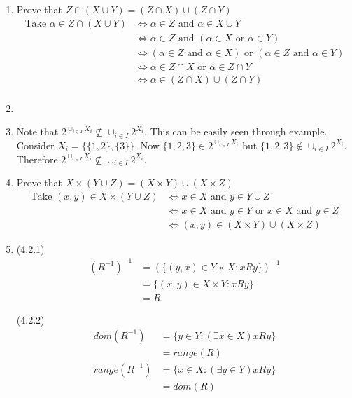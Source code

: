 \begin{enumerate}
    \item Prove that $Z \cap (X \cup Y) = (Z \cap X) \cup (Z \cap Y)$
        \begin{align*}
            \text{Take } \alpha \in Z \cap (X \cup Y) &\Leftrightarrow \alpha \in Z \text{ and } \alpha \in X \cup Y\\
            &\Leftrightarrow \alpha \in Z \text{ and } (\alpha \in X \text{ or } \alpha \in Y)\\
            &\Leftrightarrow (\alpha \in Z \text{ and } \alpha \in X) \text{ or } (\alpha \in Z \text{ and } \alpha \in Y)\\
            &\Leftrightarrow \alpha \in Z \cap X \text{ or } \alpha \in Z \cap Y\\
            &\Leftrightarrow \alpha \in (Z \cap X) \cup (Z \cap Y)\\
        \end{align*}

    \item

    \item Note that $2^{\cup_{i \in I} X_{i}} \nsubseteq \cup_{i \in I} 2^{X_{i}}$. This can be easily seen through example. Consider $X_{i} = \{\{1,2\},\{3\}\}$. Now $\{1,2,3\} \in 2^{\cup_{i \in I} X_{i}}$ but $\{1,2,3\} \notin \cup_{i \in I} 2^{X_{i}}$. Therefore $2^{\cup_{i \in I} X_{i}} \nsubseteq \cup_{i \in I} 2^{X_{i}}$.

    \item Prove that $X\times(Y \cup Z) = (X \times Y) \cup (X \times Z)$\\
        \begin{align*}
            \text{Take } (x,y) \in X \times (Y \cup Z) &\Leftrightarrow x \in X \text{ and } y \in Y \cup Z\\
            &\Leftrightarrow x \in X \text{ and } y \in Y \text{ or } x \in X \text{ and } y \in Z\\
            &\Leftrightarrow (x,y) \in  (X \times Y) \cup (X \times Z)
        \end{align*}

    \item 
    (4.2.1)
    \begin{align*}
        (R^{-1})^{-1} &= (\{(y,x) \in Y \times X : xRy\})^{-1}\\
        &=\{(x,y) \in X \times Y : xRy\}\\
        &=R
    \end{align*}

    (4.2.2)\\
    \begin{align*}
        dom(R^{-1}) &= \{y \in Y : (\exists x \in X) xRy\}\\
        &= range(R)\\
        range(R^{-1}) &= \{x \in X : (\exists y \in Y) xRy\}\\
        &= dom(R)    
    \end{align*}

\end{enumerate}
